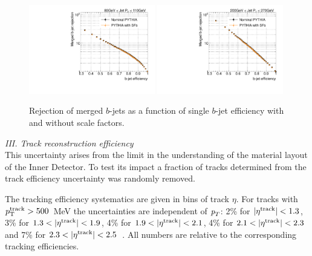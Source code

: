 \begin{figure}[tp]
\centering
\includegraphics[width=0.49\textwidth]{FIGS/systematics/LlhoodKDE_ISO_BTagCalibTest_rejvseff080.pdf}
\includegraphics[width=0.49\textwidth]{FIGS/systematics/LlhoodKDE_ISO_BTagCalibTest_rejvseff200.pdf}
\caption{Rejection of merged $b$-jets as a function of single $b$-jet efficiency with and without scale factors.}
\label{fig:btaggingSFsPerf}
\end{figure}



\vspace{3mm}
{ \em III. Track reconstruction efficiency}
\\[3mm]
This uncertainty arises from the limit in the understanding of the material layout of the Inner Detector. To test its impact a fraction of tracks determined from the track efficiency uncertainty was randomly removed.  %

The tracking efficiency systematics are given in bins of track $\eta$. For tracks with $p_{\rm{T}}^{\rm{track}} > 500$~MeV the uncertainties are independent of ${\emph{p}_{T}}$:  2\% for $|\eta^{\rm{track}}|<1.3$, 3\% for $1.3<|\eta^{\rm{track}}|<1.9$, 4\% for $1.9<|\eta^{\rm{track}}|<2.1$, 4\% for $2.1<|\eta^{\rm{track}}|<2.3$ and 7\% for $2.3<|\eta^{\rm{track}}|<2.5$~\cite{chargemultiplicity}. All numbers are relative to the corresponding tracking efficiencies.  

